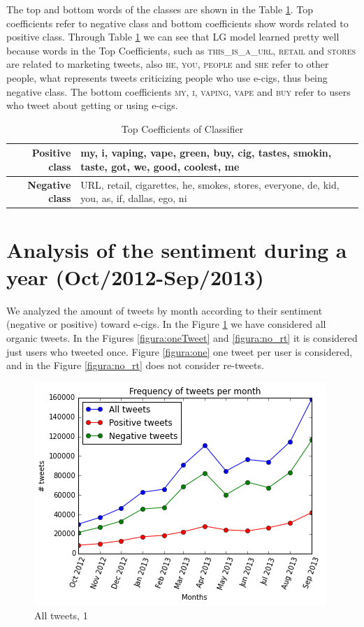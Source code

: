 \documentclass{sig-alternate}
\begin{document}
The top and bottom words of the classes are shown in the Table \ref{tab:coef}. Top coefficients refer to negative class and bottom coefficients show words related to positive class. Through Table \ref{tab:coef} we can see that LG model learned pretty well because words in the Top Coefficients, such as \textsc{this\_is\_a\_url}, \textsc{retail} and \textsc{stores} are related to marketing tweets, also \textsc{he}, \textsc{you}, \textsc{people} and \textsc{she} refer to other people, what represents tweets criticizing people who use e-cigs, thus being negative class. The bottom coefficients \textsc{my}, \textsc{i}, \textsc{vaping}, \textsc{vape} and \textsc{buy} refer to users who tweet about getting or using e-cigs.


\begin{table}[t]
\centering
\caption{Top Coefficients of Classifier}
\label{tab:coef}
\begin{tabular}{|r|l| }
\hline
{\bf Positive class} & my, i, vaping, vape, green, buy, cig, tastes, smokin, taste, got, we, good, coolest, me\\
\hline
{\bf Negative class} & URL, retail, cigarettes, he, smokes, stores, everyone, de, kid, you, as, if, dallas, ego, ni\\
\hline
\end{tabular}
\end{table}


\section{Analysis of the sentiment during a year (Oct/2012-Sep/2013)}

We analyzed the amount of tweets by month according to their sentiment (negative or positive) toward e-cigs. In the Figure \ref{figura:all_org} we have considered all organic tweets. In the Figures \ref{figura:oneTweet} and \ref{figura:no_rt} it is considered just users who tweeted once. Figure \ref{figura:one} one tweet per user is considered, and in the Figure \ref{figura:no_rt} does not consider re-tweets.

\begin{figure}[t]
  \centering
  \includegraphics[width=\columnwidth]{download(1).png}
  \caption{All tweets, 1}
  \label{figura:all_org}
\end{figure}
\end{document}
